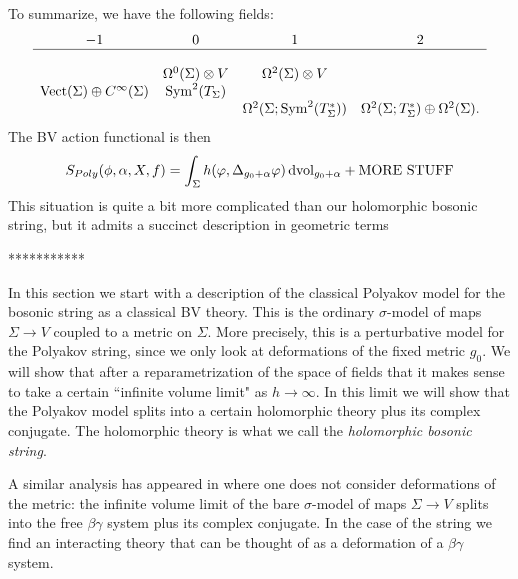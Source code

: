 To summarize, we have the following fields:
\[
\begin{array}{cccc}
-1 &0 & 1 & 2\\
\hline \\
& \Omega^{0}(\Sigma) \otimes V & \Omega^2(\Sigma) \otimes V & \\
{\rm Vect}(\Sigma) \oplus C^\infty(\Sigma) & {\rm Sym}^2(T_\Sigma) & & \\
& & \Omega^2(\Sigma ; {\rm Sym}^{2}(T^*_\Sigma)) & \Omega^2(\Sigma ; T^*_\Sigma) \oplus \Omega^2(\Sigma) .
\end{array}
\]
The BV action functional is then
\[
S_{Poly}(\phi,\alpha,X,f) = \int_\Sigma h(\varphi, \Delta_{g_0 + \alpha} \varphi)\, {\rm dvol}_{g_0+\alpha} + \text{MORE STUFF}
\]
This situation is quite a bit more complicated than our holomorphic bosonic string,
but it admits a succinct description in geometric terms  

***********

In this section we start with a description of the classical Polyakov model for the bosonic string as a classical BV theory. 
This is the ordinary $\sigma$-model of maps $\Sigma \to V$ coupled to a metric on $\Sigma$. 
More precisely, this is a perturbative model for the Polyakov string, since we only look at deformations of the fixed metric $g_0$. We will show that after a reparametrization of the space of fields that it makes sense to take a certain ``infinite volume limit" as $h \to \infty$. In this limit we will show that the Polyakov model splits into a certain holomorphic theory plus its complex conjugate. The holomorphic theory is what we call the {\em holomorphic bosonic string}.

\begin{rmk} 
A similar analysis has appeared in \cite{GGW} where one does not consider deformations of the metric: the infinite volume limit of the bare $\sigma$-model of maps $\Sigma \to V$ splits into the free $\beta\gamma$ system plus its complex conjugate. In the case of the string we find an interacting theory that can be thought of as a deformation of a $\beta\gamma$ system. 
\end{rmk}



